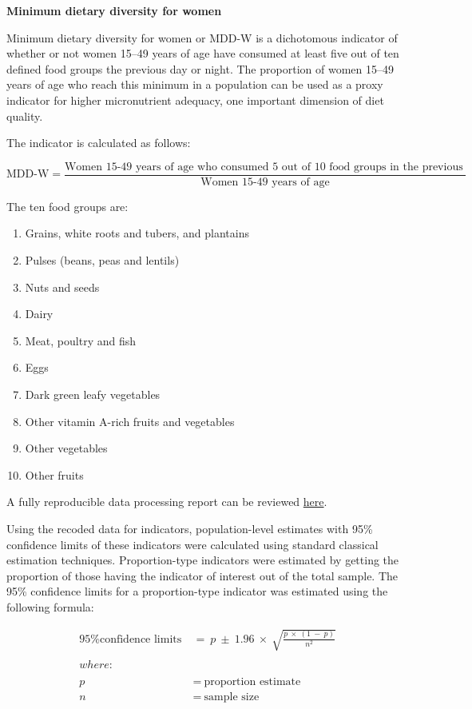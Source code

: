 \documentclass[12pt,a4paper]{article}
\providecommand{\tightlist}{%
  \setlength{\itemsep}{0pt}\setlength{\parskip}{0pt}}
\begin{document}
\textbf{Minimum dietary diversity for women}

Minimum dietary diversity for women or MDD-W is a dichotomous indicator of whether or not women 15--49 years of age have consumed at least five out of ten defined food groups the previous day or night. The proportion of women 15--49 years of age who reach this minimum in a population can be used as a proxy indicator for higher micronutrient adequacy, one important dimension of diet quality.

The indicator is calculated as follows:

\[ \text{MDD-W} = \frac{\text{Women 15-49 years of age who consumed 5 out of 10 food groups in the previous day or night}}{\text{Women 15-49 years of age}} \]

The ten food groups are:

\begin{enumerate}
\def\labelenumi{\arabic{enumi}.}
\tightlist
\item
  Grains, white roots and tubers, and plantains
\item
  Pulses (beans, peas and lentils)
\item
  Nuts and seeds
\item
  Dairy
\item
  Meat, poultry and fish
\item
  Eggs
\item
  Dark green leafy vegetables
\item
  Other vitamin A-rich fruits and vegetables
\item
  Other vegetables
\item
  Other fruits
\end{enumerate}

A fully reproducible data processing report can be reviewed \href{https://github.com/validmeasures/myanmarMCCTprocessing}{here}.

Using the recoded data for indicators, population-level estimates with 95\% confidence limits of these indicators were calculated using standard classical estimation techniques. Proportion-type indicators were estimated by getting the proportion of those having the indicator of interest out of the total sample. The 95\% confidence limits for a proportion-type indicator was estimated using the following formula:

\[
\begin{aligned}
\text{95\% confidence limits} & ~ = ~ p ~ \pm ~ 1.96 ~ \times ~ \sqrt{\frac{p ~ \times ~ (1 ~ - ~ p)}{n ^ 2}} \\
\\
where: & \\
\\
p & ~ = ~ \text{proportion estimate} \\
n & ~ = ~ \text{sample size}
\end{aligned}
\]
\end{document}
